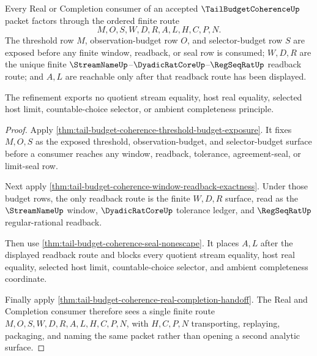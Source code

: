 \begin{theorem}
\label{thm:tail-budget-coherence-real-completion-budget-route-refinement}
Every Real or Completion consumer of an accepted $\TailBudgetCoherenceUp$ packet factors through the ordered finite route
$$
M,O,S,W,D,R,A,L,H,C,P,N.
$$
The threshold row $M$, observation-budget row $O$, and selector-budget row $S$ are exposed before any finite window, readback, or seal row is consumed; $W,D,R$ are the unique finite $\StreamNameUp$--$\DyadicRatCoreUp$--$\RegSeqRatUp$ readback route; and $A,L$ are reachable only after that readback route has been displayed.

The refinement exports no quotient stream equality, host real equality, selected host limit, countable-choice selector, or ambient completeness principle.
\end{theorem}
\begin{proof}
Apply \autoref{thm:tail-budget-coherence-threshold-budget-exposure}. It fixes $M,O,S$ as the exposed threshold, observation-budget, and selector-budget surface before a consumer reaches any window, readback, tolerance, agreement-seal, or limit-seal row.

Next apply \autoref{thm:tail-budget-coherence-window-readback-exactness}. Under those budget rows, the only readback route is the finite $W,D,R$ surface, read as the $\StreamNameUp$ window, $\DyadicRatCoreUp$ tolerance ledger, and $\RegSeqRatUp$ regular-rational readback.

Then use \autoref{thm:tail-budget-coherence-seal-nonescape}. It places $A,L$ after the displayed readback route and blocks every quotient stream equality, host real equality, selected host limit, countable-choice selector, and ambient completeness coordinate.

Finally apply \autoref{thm:tail-budget-coherence-real-completion-handoff}. The Real and Completion consumer therefore sees a single finite route $M,O,S,W,D,R,A,L,H,C,P,N$, with $H,C,P,N$ transporting, replaying, packaging, and naming the same packet rather than opening a second analytic surface.
\end{proof}

